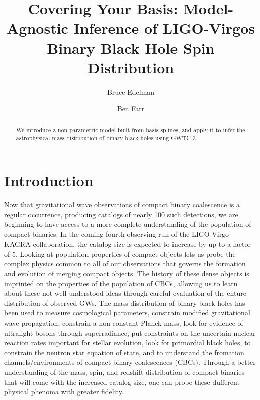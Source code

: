 \documentclass[twocolumn, linenumber]{aastex63}
\begin{document}
\title{Covering Your Basis: Model-Agnostic Inference of LIGO-Virgos Binary Black Hole Spin Distribution}

\author{Bruce Edelman}

\author{Ben Farr}

\begin{abstract}
We introduce a non-parametric model built from basis splines, and apply it to infer the astrophysical mass distribution of 
binary black holes using GWTC-3.
\end{abstract}


\section{Introduction} \label{sec:intro}

Now that gravitational wave observations of compact binary coalescence is a regular occurrence, producing catalogs of nearly 
100 such detections, we are beginning to have access to a more complete understanding of the population of compact binaries. 
In the coming fourth observing run of the LIGO-Virgo-KAGRA collaboration, the catalog size is expected to increase by up to a factor of 5. 
Looking at population properties of compact objects lets us probe the complex physics common to all of our observations that governs the 
formation and evolution of merging compact objects. The history of these dense objects is imprinted on the properties of the population 
of CBCs, allowing us to learn about these not well understood ideas through careful evaluation of the enture distribution of observed GWs. 
The mass distribution of binary black holes has been used to measure cosmological parameters, constrain modified gravitational wave propagation, 
constrain a non-constant Planck mass, look for evidence of ultralight bosons through superradiance, put constraints on the uncertain nuclear reaction 
rates important for stellar evolution, look for primordial black holes, to constrain the neutron star equation of state, 
and to understand the fromation channels/environments of compact binary coalescences (CBCs). Through a better understanding of the mass, spin, 
and redshift distribution of compact binaries that will come with the increased catalog size, one can probe these dufferent physical phenoma with 
greater fidelity.
\end{document}
